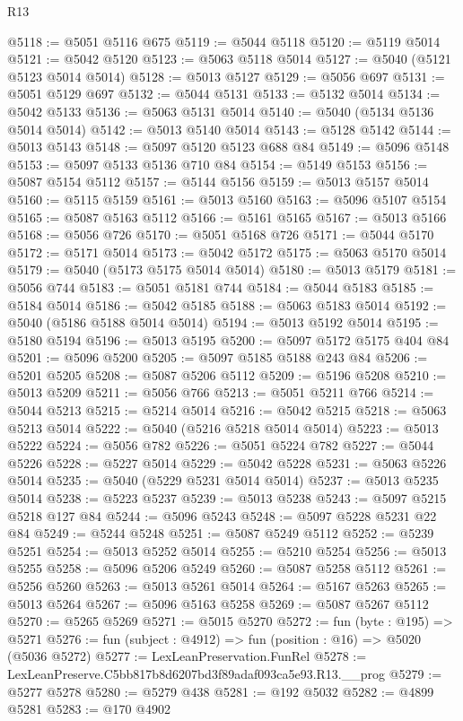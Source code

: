 \begin{lexlean}{R13}
\begin{coremodule}
@5118 := @5051 @5116 @675
@5119 := @5044 @5118
@5120 := @5119 @5014
@5121 := @5042 @5120
@5123 := @5063 @5118 @5014
@5127 := @5040 (@5121 @5123 @5014 @5014)
@5128 := @5013 @5127
@5129 := @5056 @697
@5131 := @5051 @5129 @697
@5132 := @5044 @5131
@5133 := @5132 @5014
@5134 := @5042 @5133
@5136 := @5063 @5131 @5014
@5140 := @5040 (@5134 @5136 @5014 @5014)
@5142 := @5013 @5140 @5014
@5143 := @5128 @5142
@5144 := @5013 @5143
@5148 := @5097 @5120 @5123 @688 @84
@5149 := @5096 @5148
@5153 := @5097 @5133 @5136 @710 @84
@5154 := @5149 @5153
@5156 := @5087 @5154 @5112
@5157 := @5144 @5156
@5159 := @5013 @5157 @5014
@5160 := @5115 @5159
@5161 := @5013 @5160
@5163 := @5096 @5107 @5154
@5165 := @5087 @5163 @5112
@5166 := @5161 @5165
@5167 := @5013 @5166
@5168 := @5056 @726
@5170 := @5051 @5168 @726
@5171 := @5044 @5170
@5172 := @5171 @5014
@5173 := @5042 @5172
@5175 := @5063 @5170 @5014
@5179 := @5040 (@5173 @5175 @5014 @5014)
@5180 := @5013 @5179
@5181 := @5056 @744
@5183 := @5051 @5181 @744
@5184 := @5044 @5183
@5185 := @5184 @5014
@5186 := @5042 @5185
@5188 := @5063 @5183 @5014
@5192 := @5040 (@5186 @5188 @5014 @5014)
@5194 := @5013 @5192 @5014
@5195 := @5180 @5194
@5196 := @5013 @5195
@5200 := @5097 @5172 @5175 @404 @84
@5201 := @5096 @5200
@5205 := @5097 @5185 @5188 @243 @84
@5206 := @5201 @5205
@5208 := @5087 @5206 @5112
@5209 := @5196 @5208
@5210 := @5013 @5209
@5211 := @5056 @766
@5213 := @5051 @5211 @766
@5214 := @5044 @5213
@5215 := @5214 @5014
@5216 := @5042 @5215
@5218 := @5063 @5213 @5014
@5222 := @5040 (@5216 @5218 @5014 @5014)
@5223 := @5013 @5222
@5224 := @5056 @782
@5226 := @5051 @5224 @782
@5227 := @5044 @5226
@5228 := @5227 @5014
@5229 := @5042 @5228
@5231 := @5063 @5226 @5014
@5235 := @5040 (@5229 @5231 @5014 @5014)
@5237 := @5013 @5235 @5014
@5238 := @5223 @5237
@5239 := @5013 @5238
@5243 := @5097 @5215 @5218 @127 @84
@5244 := @5096 @5243
@5248 := @5097 @5228 @5231 @22 @84
@5249 := @5244 @5248
@5251 := @5087 @5249 @5112
@5252 := @5239 @5251
@5254 := @5013 @5252 @5014
@5255 := @5210 @5254
@5256 := @5013 @5255
@5258 := @5096 @5206 @5249
@5260 := @5087 @5258 @5112
@5261 := @5256 @5260
@5263 := @5013 @5261 @5014
@5264 := @5167 @5263
@5265 := @5013 @5264
@5267 := @5096 @5163 @5258
@5269 := @5087 @5267 @5112
@5270 := @5265 @5269
@5271 := @5015 @5270
@5272 := fun (byte : @195) => @5271
@5276 := fun (subject : @4912) => fun (position : @16) => @5020 (@5036 @5272)
@5277 := LexLeanPreservation.FunRel
@5278 := LexLeanPreserve.C5bb817b8d6207bd3f89adaf093ca5e93.R13.__prog
@5279 := @5277 @5278
@5280 := @5279 @438
@5281 := @192 @5032
@5282 := @4899 @5281
@5283 := @170 @4902

\end{coremodule}
\end{lexlean}
